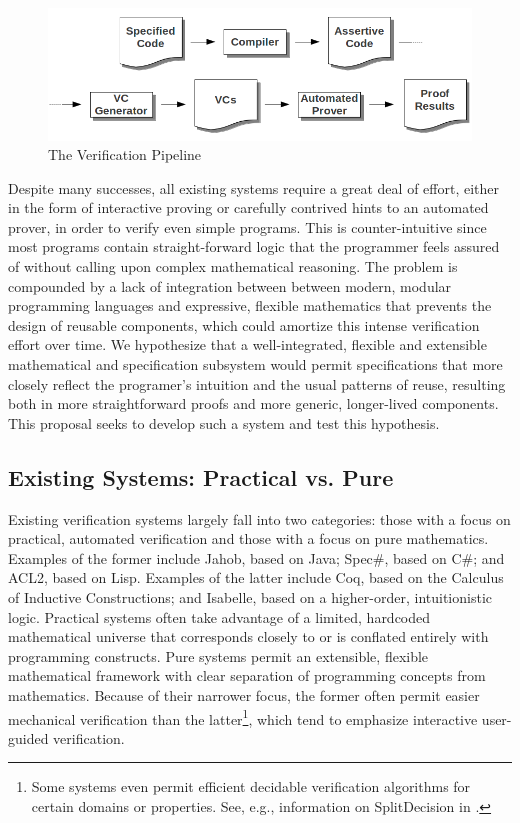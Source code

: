 \begin{figure}
  \centering
    \includegraphics[width=\textwidth]{verification_pipeline}
  \caption{The Verification Pipeline\label{fig:pipeline}}
\end{figure}

Despite many successes, all existing systems require a great deal of effort, either in the form of interactive proving or carefully contrived hints to an automated prover, in order to verify even simple programs.  This is counter-intuitive since most programs contain straight-forward logic that the programmer feels assured of without calling upon complex mathematical reasoning.  The problem is compounded by a lack of integration between between modern, modular programming languages and expressive, flexible mathematics that prevents the design of reusable components, which could amortize this intense verification effort over time.  We hypothesize that a well-integrated, flexible and extensible mathematical and specification subsystem would permit specifications that more closely reflect the programer's intuition and the usual patterns of reuse, resulting both in more straightforward proofs and more generic, longer-lived components.  This proposal seeks to develop such a system and test this hypothesis.

\subsection{Existing Systems: Practical vs. Pure}
Existing verification systems largely fall into two categories: those with a focus on practical, automated verification and those with a focus on pure mathematics.  Examples of the former include Jahob\cite{kuncakJahobOverview}, based on Java; Spec\#\cite{specsharp}, based on C\#; and ACL2\cite{kaufmannACL2}, based on Lisp.  Examples of the latter include Coq\cite{coq}, based on the Calculus of Inductive Constructions; and Isabelle\cite{nipkowIsabelle}, based on a higher-order, intuitionistic logic.  Practical systems often take advantage of a limited, hardcoded mathematical universe that corresponds closely to or is conflated entirely with programming constructs.  Pure systems permit an extensible, flexible mathematical framework with clear separation of programming concepts from mathematics.  Because of their narrower focus, the former often permit easier mechanical verification than the latter\footnote{Some systems even permit efficient decidable verification algorithms for certain domains or properties.  See, e.g., information on SplitDecision in \cite{Sit11}.}, which tend to emphasize interactive user-guided verification.

